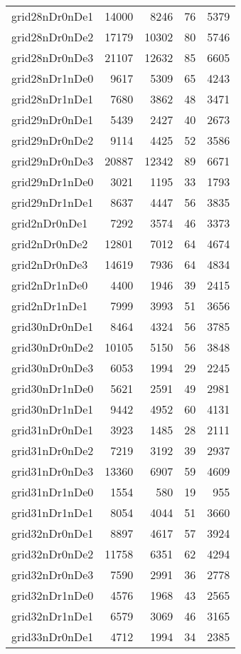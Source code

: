\begin{longtable}{lrrrr}
grid28nDr0nDe1 & 14000 & 8246 & 76 & 5379 \\
grid28nDr0nDe2 & 17179 & 10302 & 80 & 5746 \\
grid28nDr0nDe3 & 21107 & 12632 & 85 & 6605 \\
grid28nDr1nDe0 & 9617 & 5309 & 65 & 4243 \\
grid28nDr1nDe1 & 7680 & 3862 & 48 & 3471 \\
grid29nDr0nDe1 & 5439 & 2427 & 40 & 2673 \\
grid29nDr0nDe2 & 9114 & 4425 & 52 & 3586 \\
grid29nDr0nDe3 & 20887 & 12342 & 89 & 6671 \\
grid29nDr1nDe0 & 3021 & 1195 & 33 & 1793 \\
grid29nDr1nDe1 & 8637 & 4447 & 56 & 3835 \\
grid2nDr0nDe1 & 7292 & 3574 & 46 & 3373 \\
grid2nDr0nDe2 & 12801 & 7012 & 64 & 4674 \\
grid2nDr0nDe3 & 14619 & 7936 & 64 & 4834 \\
grid2nDr1nDe0 & 4400 & 1946 & 39 & 2415 \\
grid2nDr1nDe1 & 7999 & 3993 & 51 & 3656 \\
grid30nDr0nDe1 & 8464 & 4324 & 56 & 3785 \\
grid30nDr0nDe2 & 10105 & 5150 & 56 & 3848 \\
grid30nDr0nDe3 & 6053 & 1994 & 29 & 2245 \\
grid30nDr1nDe0 & 5621 & 2591 & 49 & 2981 \\
grid30nDr1nDe1 & 9442 & 4952 & 60 & 4131 \\
grid31nDr0nDe1 & 3923 & 1485 & 28 & 2111 \\
grid31nDr0nDe2 & 7219 & 3192 & 39 & 2937 \\
grid31nDr0nDe3 & 13360 & 6907 & 59 & 4609 \\
grid31nDr1nDe0 & 1554 & 580 & 19 & 955 \\
grid31nDr1nDe1 & 8054 & 4044 & 51 & 3660 \\
grid32nDr0nDe1 & 8897 & 4617 & 57 & 3924 \\
grid32nDr0nDe2 & 11758 & 6351 & 62 & 4294 \\
grid32nDr0nDe3 & 7590 & 2991 & 36 & 2778 \\
grid32nDr1nDe0 & 4576 & 1968 & 43 & 2565 \\
grid32nDr1nDe1 & 6579 & 3069 & 46 & 3165 \\
grid33nDr0nDe1 & 4712 & 1994 & 34 & 2385 \\

\end{longtable}
